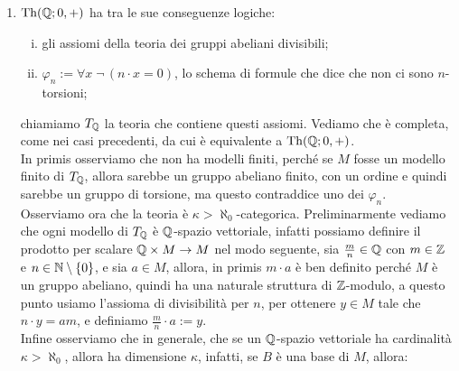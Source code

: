 \begin{soln}
\begin{enumerate}
        mentre la classe che contiene tale elemento sarà $L$-isomorfa a $(\NN;s)$, usando la funzione che mappa $0$ nell'elemento che non ha predecessore e tutti gli altri naturali per commutatività del successore.\\
        Quindi come prima abbiamo scoperto che $M_1$ e $M_2$ sono unione disgiunta di classi di equivalenza, che sono sottostrutture, una delle quali isomorfa a $(\NN;s)$ e tutte le altre isomorfe a $(\ZZ;s)$;
        per stabilire quante sono facciamo esattamente lo stesso conto di prima ottenendo:
        \[ \kappa = \aleph_0 + \aleph_0 \cdot |\{\text{classi di equivalenza in $M_i$}\}| = \aleph_0 \cdot |\{\text{classi di equivalenza in $M_i$}\}| \]
        da cui segue che $M_1$ e $M_2$ hanno $\kappa$ classi di equivalenza, e quindi sono isomorfi componendo ed incollando le mappe come prima.
        \item $\operatorname{Th}(\mathbb Q;0,+)$ ha tra le sue conseguenze logiche:
        \begin{enumerate}[(i)]
            \item gli assiomi della teoria dei gruppi abeliani divisibili;
            \item $\varphi_n := \forall x \; \neg\,(n \cdot x = 0)$, lo schema di formule che dice che non ci sono $n$-torsioni;
        \end{enumerate}
        chiamiamo $T_{\mathbb Q}$ la teoria che contiene questi assiomi. Vediamo che è completa, come nei casi precedenti, da cui è equivalente a $\operatorname{Th}(\mathbb Q;0,+)$.\\
        In primis osserviamo che non ha modelli finiti, perché se $M$ fosse un modello finito di $T_{\mathbb Q}$, allora sarebbe un gruppo abeliano finito, con un ordine
        e quindi sarebbe un gruppo di torsione, ma questo contraddice uno dei $\varphi_n$.\\
        Osserviamo ora che la teoria è $\kappa > \aleph_0$-categorica. Preliminarmente vediamo che ogni modello di $T_{\mathbb Q}$ è $\mathbb Q$-spazio vettoriale, infatti possiamo definire il prodotto per scalare $\mathbb Q \times M \to M$ nel
        modo seguente, sia $\frac{m}{n} \in \mathbb Q$ con $m \in \mathbb Z$ e $n \in \mathbb N \setminus \{0\}$, e sia $a \in M$, allora, in primis $m \cdot a$ è ben definito perché $M$ è un gruppo abeliano, quindi ha una naturale struttura di $\mathbb Z$-modulo,
        a questo punto usiamo l'assioma di divisibilità per $n$, per ottenere $y \in M$ tale che $n \cdot y = am$, e definiamo $\frac{m}{n} \cdot a := y$.\\
        Infine osserviamo che in generale, che se un $\mathbb Q$-spazio vettoriale ha cardinalità $\kappa > \aleph_0$, allora ha dimensione $\kappa$, infatti, se $B$ è una base di $M$, allora:

\end{enumerate}
\end{soln}
